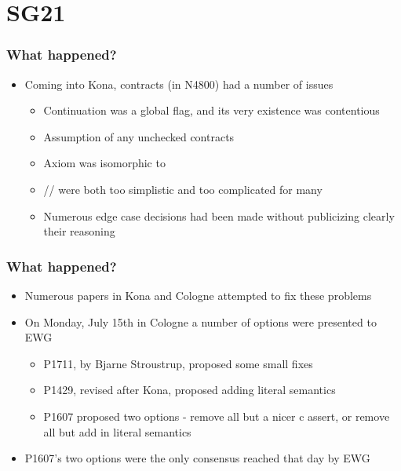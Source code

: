 \section{SG21}
\begin{frame}
\end{frame}

\begin{frame}
  \frametitle{What happened?}
  \begin{itemize}
  \item Coming into Kona, contracts (in N4800) had a number of issues \pause
    \begin{itemize}
    \item Continuation was a global flag, and its very existence was contentious \pause
    \item Assumption of any unchecked contracts \pause
    \item Axiom was isomorphic to  \pause
    \item {}// were both too simplistic and too complicated for many \pause
    \item Numerous edge case decisions had been made without publicizing clearly their reasoning
    \end{itemize}
  \end{itemize}
\end{frame}

\begin{frame}
  \frametitle{What happened?}
  \begin{itemize}
  \item Numerous papers in Kona and Cologne attempted to fix these problems \pause
  \item On Monday, July 15th in Cologne a number of options were presented to EWG \pause
    \begin{itemize}
    \item P1711, by Bjarne Stroustrup, proposed some small fixes \pause
    \item P1429, revised after Kona, proposed adding literal semantics \pause
    \item P1607 proposed two options - remove all but a nicer c assert, or remove all but add in literal semantics \pause
    \end{itemize}
  \item P1607's two options were the only consensus reached that day by EWG
  \end{itemize}
\end{frame}


